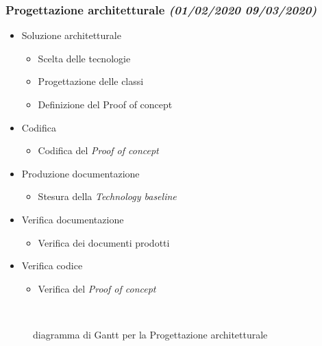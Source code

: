 \documentclass[../piano-di-progetto.tex]{subfiles}
\begin{document}
\subsubsection[Progettazione architetturale]{Progettazione architetturale {\normalsize\normalfont\itshape(01/02/2020  09/03/2020)}}%
\label{subs:progettazione_architetturale}
\begin{itemize}
  \item Soluzione architetturale
  \begin{itemize}
    \item Scelta delle tecnologie
    \item Progettazione delle classi
    \item Definizione del \textit{}{Proof of concept}
  \end{itemize}
  \item Codifica
  \begin{itemize}
    \item Codifica del \textit{Proof of concept}
  \end{itemize}
  \item Produzione documentazione
  \begin{itemize}
    \item Stesura della \textit{Technology baseline}
  \end{itemize}
  \item Verifica documentazione
  \begin{itemize}
    \item Verifica dei documenti prodotti
  \end{itemize}
  \item Verifica  codice 
  \begin{itemize}
    \item Verifica  del \textit{Proof of concept}
  \end{itemize}
\end{itemize}
\begin{figure}[H]
  \centering
  
  \caption{diagramma di Gantt per la Progettazione architetturale}%
~~\label{fig:gantt_progettazione_architetturale}
\end{figure}
\end{document}
